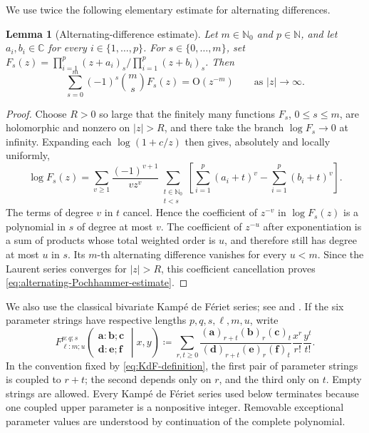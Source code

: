 \documentclass[10pt]{amsart}
\newcommand{\N}{\mathbb N}
\newcommand{\Nzero}{\mathbb N_0}
\newcommand{\abs}[1]{\lvert#1\rvert}
\theoremstyle{plain}
\newtheorem{lemma}[theorem]{Lemma}
\theoremstyle{definition}
\theoremstyle{remark}
\begin{document}
We use twice the following elementary estimate for alternating differences.

\begin{lemma}[Alternating-difference estimate]
\label{lem:alternating-Pochhammer-estimate}
Let \(m\in\Nzero\) and \(p\in\N\), and let \(a_i,b_i\in\mathbb C\) for
every \(i\in\{1,\ldots,p\}\). For \(s\in\{0,\ldots,m\}\), set
\(F_s(z)=\prod_{i=1}^p(z+a_i)_s/\prod_{i=1}^p(z+b_i)_s\). Then
\begin{equation}
 \sum_{s=0}^m(-1)^s\binom msF_s(z)=\mathrm O(z^{-m})
 \qquad\text{as }\abs z\to\infty.
 \label{eq:alternating-Pochhammer-estimate}
\end{equation}
\end{lemma}

\begin{proof}
Choose \(R>0\) so large that the finitely many functions \(F_s\),
\(0\le s\le m\), are holomorphic and nonzero on \(\abs z>R\), and
there take the branch \(\log F_s\to0\) at infinity. Expanding each
\(\log(1+c/z)\) then gives, absolutely and locally uniformly,
\begin{equation}
 \log F_s(z)=
 \sum_{v\ge1}\frac{(-1)^{v+1}}{v z^v}
 \sum_{\substack{t\in\Nzero\\t<s}}
 \left[\sum_{i=1}^p(a_i+t)^v-\sum_{i=1}^p(b_i+t)^v\right].
 \label{eq:log-Pochhammer-quotient}
\end{equation}
The terms of degree \(v\) in \(t\) cancel. Hence the coefficient of
\(z^{-v}\) in \(\log F_s(z)\) is a polynomial in \(s\) of degree at most
\(v\). The coefficient of \(z^{-u}\) after exponentiation is a sum of
products whose total weighted order is \(u\), and therefore still has degree
at most \(u\) in \(s\). Its \(m\)-th alternating difference vanishes for
every \(u<m\). Since the Laurent series converges for \(\abs z>R\), this
coefficient cancellation proves \eqref{eq:alternating-Pochhammer-estimate}.
\end{proof}

We also use the classical bivariate Kamp\'e de F\'eriet series; see
\cite[Chapter~1]{SrivastavaKarlsson1985} and
\cite{BranquinhoDiazFoulquieManas2025Classical}. If the six parameter
strings have respective lengths \(p,q,s,\ell,m,u\), write
\begin{equation}
 F_{\ell:m;u}^{p:q;s}
 \left(
 \begin{matrix}
  \boldsymbol a:\boldsymbol b;\boldsymbol c\\
  \boldsymbol d:\boldsymbol e;\boldsymbol f
 \end{matrix}
 \middle|x,y\right)
 \coloneq\sum_{r,t\ge0}
 \frac{(\boldsymbol a)_{r+t}
       (\boldsymbol b)_r(\boldsymbol c)_t}
      {(\boldsymbol d)_{r+t}
       (\boldsymbol e)_r(\boldsymbol f)_t}
 \frac{x^r}{r!}\frac{y^t}{t!}.
 \label{eq:KdF-definition}
\end{equation}
In the convention fixed by \eqref{eq:KdF-definition}, the first pair of
parameter strings is coupled to \(r+t\); the second
depends only on \(r\), and the third only on \(t\). Empty strings are
allowed. Every Kamp\'e de F\'eriet series used below terminates because one
coupled upper parameter is a nonpositive integer. Removable exceptional
parameter values are understood by continuation of the complete
polynomial.
\end{document}
